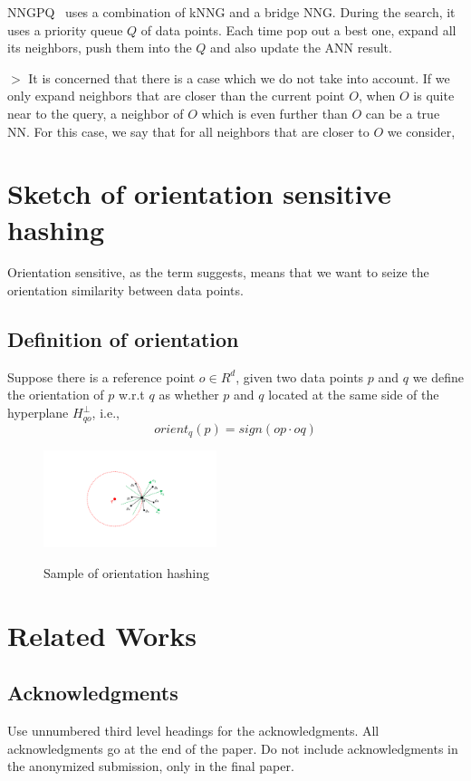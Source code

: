 \documentclass{article} %
\begin{document}
NNGPQ~\cite{WangJDNNGPQ2013} uses a combination of kNNG and a bridge NNG. During the search, it uses a priority queue $Q$ of data points. Each time pop out a best one, expand all its neighbors, push them into the $Q$ and also update the ANN result.

$>$ It is concerned that there is a case which we do not take into account. If we only expand neighbors that are closer than the current point $O$, when $O$ is quite near to the query, a neighbor of $O$ which is even further than $O$ can be a true NN. For this case, we say that for all neighbors that are closer to $O$ we consider, 

\section{Sketch of orientation sensitive hashing}\label{osh}

Orientation sensitive, as the term suggests, means that we want to seize the orientation similarity between data points.

\subsection{Definition of orientation}
Suppose there is a reference point $o \in R^d$, given two data points $p$ and $q$ we define the orientation of $p$ w.r.t $q$ as whether $p$ and $q$ located at the same side of the hyperplane $H_{qo}^{\bot}$, i.e.,
\begin{equation}
orient_q(p)=sign(op\cdot oq)
\end{equation}

\begin{figure}
	\centering
	\includegraphics[width=0.45\textwidth]{OSH.pdf}\\
	\caption{Sample of orientation hashing}\label{fig:nncompare}
\end{figure}


\section{Related Works}






\subsection*{Acknowledgments}

Use unnumbered third level headings for the acknowledgments. All
acknowledgments go at the end of the paper. Do not include
acknowledgments in the anonymized submission, only in the
final paper.




\end{document}
